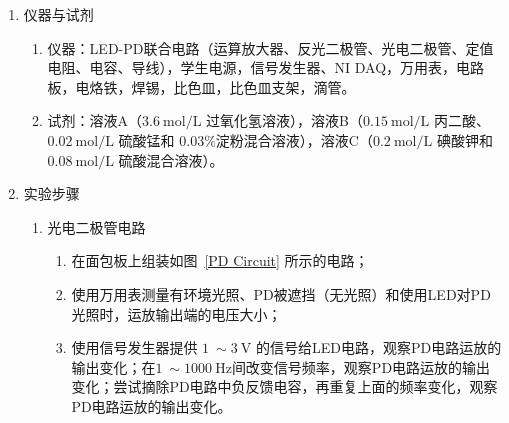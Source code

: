 \documentclass[a4paper]{article}
\begin{document}
\begin{enumerate}[label=\chinese*.,left=0pt]
\begin{enumerate}[label=\arabic*.,left=0pt]
            \item 碘钟反应
            \\[1mm]
            碘钟反应是一类典型的震荡反应，即反应过程中某组分的浓度不呈现单调变化，而是周期性变化的现象。实验所使用的反应体系包含三种反应物：过氧化氢、丙二酸与碘酸钾，另外包含催化剂硫酸锰和硫酸，以及指示剂淀粉。反应过程可看作是多个反应的循环：
            \begin{align*}
                \ce{2IO^-_3 + 5 H_2O_2 + 2 H^+ &-> I_2 + 5 O_2 + 6 H_2O} \\
                \ce{I_2 + CH_2(COOH)_2& -> CHI(COOH)_2 + H^+ + I^-} \\
                \ce{2CHI(COOH)_2 + 7H_2O_2 &-> 6CO_2 + I_2 + 10H2O}\\
                \ce{2I^- + H2O2 + 2H+&-> I_2 + 2H2O}
            \end{align*}
            反应过程中，碘单质的浓度出现周期性的震荡，由于其可与淀粉形成蓝色复合物，溶液的颜色也出现周期性的改变。
            
        \end{enumerate}
    
    \item 仪器与试剂
        \begin{enumerate}[label=\arabic*.,left=0pt]
            \item 仪器：LED-PD联合电路（运算放大器、反光二极管、光电二极管、定值电阻、电容、导线），学生电源，信号发生器、NI DAQ，万用表，电路板，电烙铁，焊锡，比色皿，比色皿支架，滴管。
            \item 试剂：溶液A（$\qty{3.6}{\mol \per \L}$ 过氧化氢溶液），溶液B（$\qty{0.15}{\mol \per \L}$ 丙二酸、$\qty{0.02}{\mol \per \L}$ 硫酸锰和 $0.03\%$淀粉混合溶液），溶液C（$\qty{0.2}{\mol \per \L}$ 碘酸钾和 $\qty{0.08}{\mol \per \L}$ 硫酸混合溶液）。
        \end{enumerate}

    \item 实验步骤
        \begin{enumerate}[label=\arabic*.,left=0pt]
            \item 光电二极管电路
            \begin{enumerate}[label=(\alph*),left=0pt]
                \item 在面包板上组装如图~\ref{PD Circuit} 所示的电路；
                \item 使用万用表测量有环境光照、PD被遮挡（无光照）和使用LED对PD光照时，运放输出端的电压大小；
                \item 使用信号发生器提供 $\qty{1}{} \sim \qty{3}{\V}$ 的信号给LED电路，观察PD电路运放的输出变化；在$\qty{1}{} \sim \qty{1000}{\Hz}$间改变信号频率，观察PD电路运放的输出变化；尝试摘除PD电路中负反馈电容，再重复上面的频率变化，观察PD电路运放的输出变化。
            \end{enumerate}


\end{enumerate}
\end{enumerate}
\end{document}
